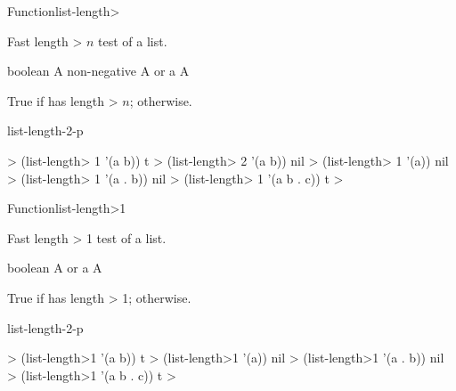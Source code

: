 \documentclass[10pt,twoside,english,pdftex]{article}
\begin{document}
\begin{functiondoc}{Function}{list-length>}%
  {
    \returns{} }
%
%

\fnsyntax

\fnpurpose Fast length > $n$ test of a list.

\fnpackage {}

\fnmodule {}

\fnargs
\begin{args}{boolean}
\arg[n] A non-negative 
\arg[list] A  or a 
\arg[boolean] A 
\end{args}

\fnreturns True if  has length > $n$; \nil{} otherwise.

\begin{alsos}{list-length-2-p}
\end{alsos}

\fnexamples
%
\W\supp
\begin{example}
  > (list-length> 1 '(a b))
  t
  > (list-length> 2 '(a b))
  nil
  > (list-length> 1 '(a))
  nil\goodpagebreak
  > (list-length> 1 '(a . b))
  nil
  > (list-length> 1 '(a b . c))
  t
  >
\end{example}

\end{functiondoc}


\begin{functiondoc}{Function}{list-length>1}%
  {
    \returns{} }
%
%

\fnsyntax

\fnpurpose Fast length > 1 test of a list.

\fnpackage {}

\fnmodule {}

\fnargs
\begin{args}{boolean}
\arg[list] A  or a 
\arg[boolean] A 
\end{args}

\fnreturns True if  has length > 1; \nil{} otherwise.

\begin{alsos}{list-length-2-p}
\end{alsos}

\fnexamples
%
\W\supp
\begin{example}
  > (list-length>1 '(a b))
  t
  > (list-length>1 '(a))
  nil\goodpagebreak
  > (list-length>1 '(a . b))
  nil
  > (list-length>1 '(a b . c))
  t
  >
\end{example}

\end{functiondoc}
\end{document}
